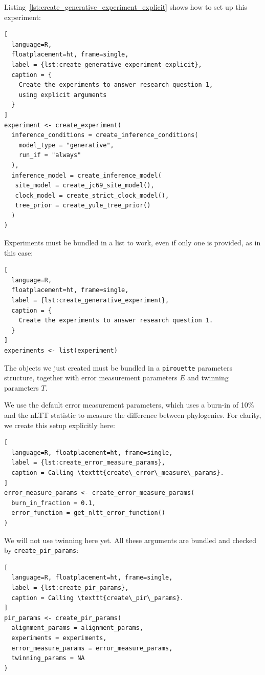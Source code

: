 \documentclass{article}
\begin{document}
Listing~\ref{lst:create_generative_experiment_explicit} shows how to
set up this experiment:

\begin{lstlisting}[
  language=R, 
  floatplacement=ht, frame=single,
  label = {lst:create_generative_experiment_explicit},
  caption = {
    Create the experiments to answer research question 1, 
    using explicit arguments
  }
]
experiment <- create_experiment(
  inference_conditions = create_inference_conditions(
    model_type = "generative", 
    run_if = "always"
  ), 
  inference_model = create_inference_model(
   site_model = create_jc69_site_model(), 
   clock_model = create_strict_clock_model(), 
   tree_prior = create_yule_tree_prior()
  )
)
\end{lstlisting}

Experiments must be bundled in a list to work, even if only one is provided, as 
in this case:

\begin{lstlisting}[
  language=R, 
  floatplacement=ht, frame=single,
  label = {lst:create_generative_experiment},
  caption = {
    Create the experiments to answer research question 1.
  }
]
experiments <- list(experiment)
\end{lstlisting}

The objects we just created must be bundled
in a \verb;pirouette; parameters structure,
together with error measurement parameters $\mathit{E}$ and
twinning parameters $\mathit{T}$. 

We use the default error measurement
parameters, which uses a burn-in of 10\% and the nLTT statistic to
measure the difference between phylogenies. For clarity,
we create this setup explicitly here:

\begin{lstlisting}[
  language=R, floatplacement=ht, frame=single,
  label = {lst:create_error_measure_params},
  caption = Calling \texttt{create\_error\_measure\_params}.
]
error_measure_params <- create_error_measure_params(
  burn_in_fraction = 0.1, 
  error_function = get_nltt_error_function()
)
\end{lstlisting}

We will not use twinning here yet.  
All these arguments are bundled
and checked by \verb;create_pir_params;:

\begin{lstlisting}[
  language=R, floatplacement=ht, frame=single,
  label = {lst:create_pir_params},
  caption = Calling \texttt{create\_pir\_params}.
]
pir_params <- create_pir_params(
  alignment_params = alignment_params,
  experiments = experiments,
  error_measure_params = error_measure_params,
  twinning_params = NA
)
\end{lstlisting}
\end{document}
